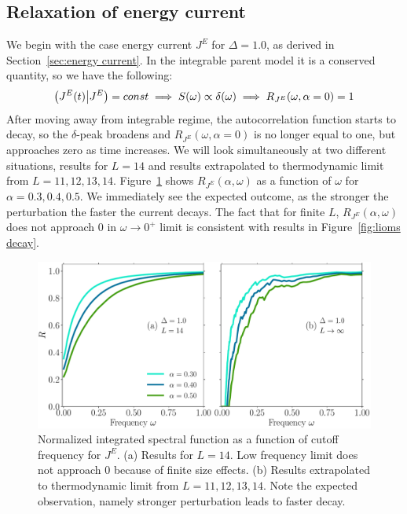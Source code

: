 \subsection{Relaxation of energy current}
We begin with the case energy current \(J^E\) for \(\Delta = 1.0\), as derived in Section~\ref{sec:energy current}.
In the integrable parent model it is a conserved quantity, so we have the following:
\begin{equation*}
  \left(J^E(t) \middle| J^E\right) = const \implies S(\omega) \propto \delta(\omega)
  \implies R_{J^E}(\omega,\alpha=0) = 1
\end{equation*}
After moving away from integrable regime, the autocorrelation function starts to decay,
so the \(\delta\)-peak broadens and \(R_{J^E}(\omega,\alpha=0)\) is no longer equal to one,
but approaches zero as time increases. We will look simultaneously at two different situations,
results for \(L=14\) and results extrapolated to thermodynamic limit from \(L=11,12,13,14\). 
Figure~\ref{fig:current decay no scaling} shows \(R_{J^E}(\alpha,\omega)\) as a
function of \(\omega\) for \(\alpha=0.3,0.4,0.5\). We immediately see the expected outcome, as the
stronger the perturbation the faster the current decays. The fact that for finite \(L\),
\(R_{J^E}(\alpha,\omega)\) does not approach \(0\) in \(\omega\to 0^+\) limit is consistent
with results in Figure~\ref{fig:lioms decay}.
\begin{figure}[htbp]
  \centering
  \includegraphics[width=\textwidth]{Figures/current_no_scaling.pdf}
  \caption{Normalized integrated spectral function as a function of cutoff frequency for \(J^E\).
  (a) Results for \(L=14\). Low frequency limit does not approach 0
  because of finite size effects. (b) Results extrapolated to thermodynamic limit from \(L=11,12,13,14\).
  Note the expected observation, namely stronger perturbation leads to faster decay.}
  \label{fig:current decay no scaling}
\end{figure}
